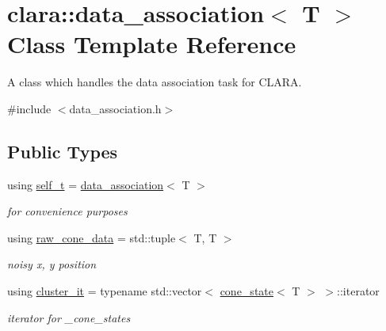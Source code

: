 \hypertarget{classclara_1_1data__association}{}\section{clara\+:\+:data\+\_\+association$<$ T $>$ Class Template Reference}
\label{classclara_1_1data__association}


A class which handles the data association task for C\+L\+A\+RA.  




{\ttfamily \#include $<$data\+\_\+association.\+h$>$}

\subsection*{Public Types}
\begin{DoxyCompactItemize}
\item 
\mbox{\label{classclara_1_1data__association_a3d00cd85107ac291ba6e3ec5fcec2ff0}} 
using \hyperlink{classclara_1_1data__association_a3d00cd85107ac291ba6e3ec5fcec2ff0}{self\+\_\+t} = \hyperlink{classclara_1_1data__association}{data\+\_\+association}$<$ T $>$
\begin{DoxyCompactList}\small\item\em for convenience purposes \end{DoxyCompactList}\item 
\mbox{\label{classclara_1_1data__association_a8232de58bbfc0b4897e4efa62ca97ccc}} 
using \hyperlink{classclara_1_1data__association_a8232de58bbfc0b4897e4efa62ca97ccc}{raw\+\_\+cone\+\_\+data} = std\+::tuple$<$ T, T $>$
\begin{DoxyCompactList}\small\item\em noisy {\ttfamily x}, {\ttfamily y} position \end{DoxyCompactList}\item 
\mbox{\label{classclara_1_1data__association_a2f261851d4dafc8c9d2a197c16be6ad6}} 
using \hyperlink{classclara_1_1data__association_a2f261851d4dafc8c9d2a197c16be6ad6}{cluster\+\_\+it} = typename std\+::vector$<$ \hyperlink{classclara_1_1cone__state}{cone\+\_\+state}$<$ T $>$ $>$\+::iterator
\begin{DoxyCompactList}\small\item\em iterator for \+\_\+cone\+\_\+states \end{DoxyCompactList}\end{DoxyCompactItemize}
